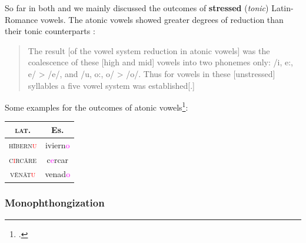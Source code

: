 \documentclass{report}[12pt]
\begin{document}
So far in both  and  we mainly discussed the outcomes of \textbf{stressed} (\emph{tonic}) Latin-Romance vowels. The atonic vowels showed greater degrees of reduction than their tonic counterparts \parencite[p.~113]{lloyd_spanish}:
\begin{quote}
  The result [of the vowel system reduction in atonic vowels] was the coalescence of these [high and mid] vowels into two phonemes only: /i, e:, e/ > /e/, and /u, o:, o/ > /o/. Thus for vowels in these [unstressed] syllables a five vowel system was established[.] 
\end{quote}
Some examples for the outcomes of atonic vowels\footcite[p.~113]{lloyd_spanish}:
\begin{center}
  \begin{tabular}{c c}
    \textsc{lat.} & Es. \\
    \hline
    \textsc{h\={i}bern\textcolor{red}{u}} & iviern\textcolor{magenta}{o} \\
    \textsc{c\textcolor{red}{i}rc\={a}re} & c\textcolor{magenta}{e}rcar \\
    \textsc{v\={e}n\={a}t\textcolor{red}{u}} & venad\textcolor{magenta}{o} \\
  \end{tabular}
\end{center}

\subsubsection{Monophthongization}
\end{document}
